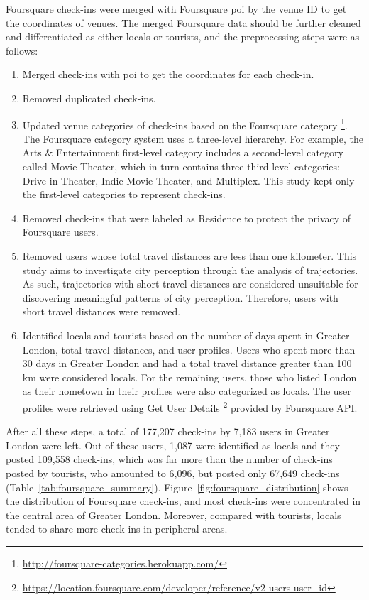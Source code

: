 \documentclass{article}
\begin{document}
Foursquare check-ins were merged with Foursquare \acrshort{poi} by the venue ID to get the coordinates of venues. The merged Foursquare data should be further cleaned and differentiated as either locals or tourists, and the preprocessing steps were as follows:
\begin{enumerate}
    \item Merged check-ins with \acrshort{poi} to get the coordinates for each check-in.
    \item Removed duplicated check-ins.
    \item Updated venue categories of check-ins based on the Foursquare category \footnote{\url{http://foursquare-categories.herokuapp.com/}}. The Foursquare category system uses a three-level hierarchy. For example, the Arts \& Entertainment first-level category includes a second-level category called Movie Theater, which in turn contains three third-level categories: Drive-in Theater, Indie Movie Theater, and Multiplex. This study kept only the first-level categories to represent 
    check-ins.
    \item Removed check-ins that were labeled as Residence to protect the privacy of Foursquare users.
    \item Removed users whose total travel distances are less than one kilometer. This study aims to investigate city perception through the analysis of trajectories. As such, trajectories with short travel distances are considered unsuitable for discovering meaningful patterns of city perception. Therefore, users with short travel distances were removed.
    \item Identified locals and tourists based on the number of days spent in Greater London, total travel distances, and user profiles. Users who spent more than 30 days in Greater London and had a total travel distance greater than 100 km were considered locals. For the remaining users, those who listed London as their hometown in their profiles were also categorized as locals. The user profiles were retrieved using Get User Details \footnote{\url{https://location.foursquare.com/developer/reference/v2-users-user_id}} provided by Foursquare API.
\end{enumerate}

After all these steps, a total of 177,207 check-ins by 7,183 users in Greater London were left. Out of these users, 1,087 were identified as locals and they posted 109,558 check-ins, which was far more than the number of check-ins posted by tourists, who amounted to 6,096, but posted only 67,649 check-ins (Table~\ref{tab:foursquare_summary}). Figure~\ref{fig:foursquare_distribution} shows the distribution of Foursquare check-ins, and most check-ins were concentrated in the central area of Greater London. Moreover, compared with tourists, locals tended to share more check-ins in peripheral areas.
\end{document}

